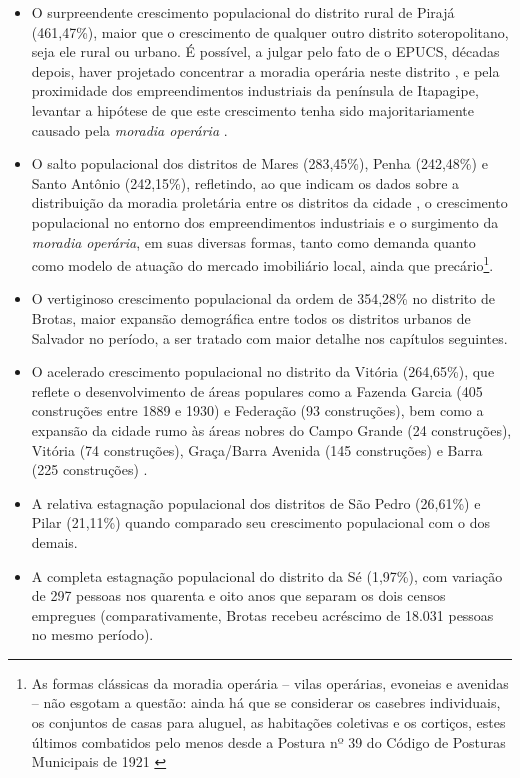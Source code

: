 \begin{itemize}
\item O surpreendente crescimento populacional do distrito rural de Pirajá (461,47\%), maior que o crescimento de qualquer outro distrito soteropolitano, seja ele rural ou urbano. É possível, a julgar pelo fato de o EPUCS, décadas depois, haver projetado concentrar a moradia operária neste distrito \cite{PREFEITURA1978,sampaio_formas_1999}, e pela proximidade dos empreendimentos industriais da península de Itapagipe, levantar a hipótese de que este crescimento tenha sido majoritariamente causado pela \textit{moradia operária} \cite{cardoso_vilas_1991}.
\item O salto populacional dos distritos de Mares (283,45\%), Penha (242,48\%) e Santo Antônio (242,15\%), refletindo, ao que indicam os dados sobre a distribuição da moradia proletária entre os distritos da cidade \cite[p.~126]{cardoso_vilas_1991}, o crescimento populacional no entorno dos empreendimentos industriais e o surgimento da \textit{moradia operária}, em suas diversas formas, tanto como demanda quanto como modelo de atuação do mercado imobiliário local, ainda que precário\footnote{As formas clássicas da moradia operária -- vilas operárias, evoneias e avenidas -- não esgotam a questão: ainda há que se considerar os casebres individuais, os conjuntos de casas para aluguel, as habitações coletivas e os cortiços, estes últimos combatidos pelo menos desde a Postura nº 39 do Código de Posturas Municipais de 1921 \cite{PREFEITURA1921}}.
\item O vertiginoso crescimento populacional da ordem de 354,28\% no distrito de Brotas, maior expansão demográfica entre todos os distritos urbanos de Salvador no período, a ser tratado com maior detalhe nos capítulos seguintes.
\item O acelerado crescimento populacional no distrito da Vitória (264,65\%), que reflete o desenvolvimento de áreas populares como a Fazenda Garcia (405 construções entre 1889 e 1930) e Federação (93 construções), bem como a expansão da cidade rumo às áreas nobres do Campo Grande (24 construções), Vitória (74 construções), Graça/Barra Avenida (145 construções) e Barra (225 construções) \cite[p.~295]{almeida_victoria_1997}.
\item A relativa estagnação populacional dos distritos de São Pedro (26,61\%) e Pilar (21,11\%) quando comparado seu crescimento populacional com o dos demais. 
\item A completa estagnação populacional do distrito da Sé (1,97\%), com variação de 297 pessoas nos quarenta e oito anos que separam os dois censos empregues (comparativamente, Brotas recebeu acréscimo de 18.031 pessoas no mesmo período).

\end{itemize}
